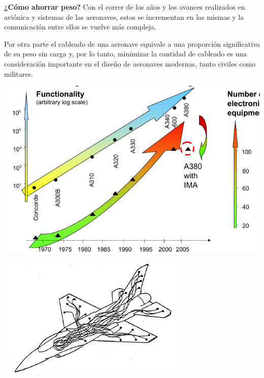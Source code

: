  \begin{myboxVerde}{\bf ¿C\'omo ahorrar peso? }
Con el correr de los años y los avances realizados en aviónica y sistemas de las aeronaves, estos se incrementan en las mismas y la comunicación entre ellos se vuelve más compleja. 

Por otra parte el cableado de una aeronave equivale a una proporción significativa de su peso sin carga y, por lo tanto, minimizar la cantidad de cableado  es una consideración importante en el diseño de aeronaves modernas, tanto civiles como militares.

\begin{minipage}[c]{0.3\linewidth}
  \includegraphics[width=\linewidth]{01.tablero.instrumentos/imagenes/1.5.protocolos.buses.datos/7-A380-IMA.png}
\end{minipage}\hspace{1.5em}
\begin{minipage}[c]{0.3\linewidth}
  \includegraphics[width=\linewidth]{01.tablero.instrumentos/imagenes/1.5.protocolos.buses.datos/8-avion+cableado.png}

\end{minipage}
\end{myboxVerde}
